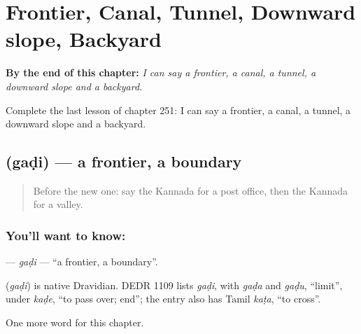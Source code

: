 
\chapter{Frontier, Canal, Tunnel, Downward slope, Backyard}
\label{ch:ka-frontier-canal-tunnel-downward-slope-backyard}

\begin{chapteropening}
\textbf{By the end of this chapter:} \emph{I can say a frontier, a canal, a tunnel, a downward slope and a backyard.}

Complete the last lesson of chapter 251: I can say a frontier, a canal, a tunnel, a downward slope and a backyard.
\end{chapteropening}

\section[\texorpdfstring{\kn{ಗಡಿ} (gaḍi)}{ಗಡಿ (gaḍi)}]{ (gaḍi) — a frontier, a boundary}

\label{lesson:KA-C251-gadi}



\begin{quote}
Before the new one: say the Kannada for a post office, then the Kannada for a valley.
\end{quote}

\subsection*{You'll want to know: }
\textbf{} — \emph{gaḍi} — \textquotedblleft{}a frontier, a boundary\textquotedblright{}.

\begin{cousinweb}
\textbf{} (\emph{gaḍi}) is native Dravidian. DEDR 1109 lists \emph{gaḍi}, with \emph{gaḍa} and \emph{gaḍu}, \textquotedblleft{}limit\textquotedblright{}, under \emph{kaḍe}, \textquotedblleft{}to pass over; end\textquotedblright{}; the entry also has Tamil \emph{kaṭa}, \textquotedblleft{}to cross\textquotedblright{}.
\end{cousinweb}

\begin{grammarlens}[title={What you've built}]
One more word for this chapter.
\end{grammarlens}

